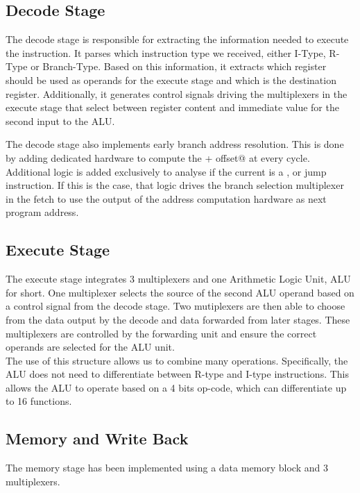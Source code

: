 \documentclass[12pt]{IEEEtran} %
\begin{document}
\subsection{Decode Stage} %
\label{sub:decode_stage}
The decode stage is responsible for extracting the information needed to execute the instruction. It parses which instruction type we received, either I-Type, R-Type or Branch-Type. Based on this information, it extracts which register should be used as operands for the execute stage and which is the destination register. Additionally, it generates control signals driving the multiplexers in the execute stage that select between register content and immediate value for the second input to the ALU. 

The decode stage also implements early branch address resolution. This is done by adding dedicated hardware to compute the \verb@base + offset@ at every cycle. Additional logic is added exclusively to analyse if the current is a \verb@BEQ@, \verb@BNE@ or jump instruction. If this is the case, that logic drives the branch selection multiplexer in the fetch to use the output of the address computation hardware as next program address.


\subsection{Execute Stage} %
\label{sub:execute_stage}
The execute stage integrates 3 multiplexers and one Arithmetic Logic Unit, ALU for short. One multiplexer selects the source of the second ALU operand based on a control signal from the decode stage. Two mutiplexers are then able to choose from the data output by the decode and data forwarded from later stages. These multiplexers are controlled by the forwarding unit and ensure the correct operands are selected for the ALU unit. \\
The use of this structure allows us to combine many operations. Specifically, the ALU does not need to differentiate between R-type and I-type instructions. This allows the ALU to operate based on a 4 bits op-code, which can differentiate up to 16 functions. 

\subsection{Memory and Write Back} %
\label{sub:memory_and_write_back}
The memory stage has been implemented using a data memory block and 3 multiplexers.
\end{document}
